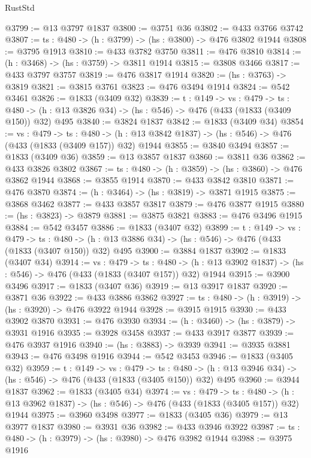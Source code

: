 \begin{lexlean}{RustStd}
\begin{coremodule}
@3799 := @13 @3797 @1837
@3800 := @3751 @36
@3802 := @433 @3766 @3742
@3807 := {ts : @480} -> (h : @3799) -> (hs : @3800) -> @476 @3802 @1944
@3808 := @3795 @1913
@3810 := @433 @3782 @3750
@3811 := @476 @3810
@3814 := (h : @3468) -> (hs : @3759) -> @3811 @1914
@3815 := @3808 @3466
@3817 := @433 @3797 @3757
@3819 := @476 @3817 @1914
@3820 := (hs : @3763) -> @3819
@3821 := @3815 @3761
@3823 := @476 @3494 @1914
@3824 := @542 @3461
@3826 := @1833 (@3409 @32)
@3839 := {t : @149} ->
  {vs : @479} ->
  {ts : @480} -> (h : @13 @3826 @34) -> (hs : @546) -> @476 (@433 (@1833 (@3409 @150)) @32) @495
@3840 := @3824 @1837
@3842 := @1833 (@3409 @34)
@3854 := {vs : @479} ->
  {ts : @480} -> (h : @13 @3842 @1837) -> (hs : @546) -> @476 (@433 (@1833 (@3409 @157)) @32) @1944
@3855 := @3840 @3494
@3857 := @1833 (@3409 @36)
@3859 := @13 @3857 @1837
@3860 := @3811 @36
@3862 := @433 @3826 @3802
@3867 := {ts : @480} -> (h : @3859) -> (hs : @3860) -> @476 @3862 @1944
@3868 := @3855 @1914
@3870 := @433 @3842 @3810
@3871 := @476 @3870
@3874 := (h : @3464) -> (hs : @3819) -> @3871 @1915
@3875 := @3868 @3462
@3877 := @433 @3857 @3817
@3879 := @476 @3877 @1915
@3880 := (hs : @3823) -> @3879
@3881 := @3875 @3821
@3883 := @476 @3496 @1915
@3884 := @542 @3457
@3886 := @1833 (@3407 @32)
@3899 := {t : @149} ->
  {vs : @479} ->
  {ts : @480} -> (h : @13 @3886 @34) -> (hs : @546) -> @476 (@433 (@1833 (@3407 @150)) @32) @495
@3900 := @3884 @1837
@3902 := @1833 (@3407 @34)
@3914 := {vs : @479} ->
  {ts : @480} -> (h : @13 @3902 @1837) -> (hs : @546) -> @476 (@433 (@1833 (@3407 @157)) @32) @1944
@3915 := @3900 @3496
@3917 := @1833 (@3407 @36)
@3919 := @13 @3917 @1837
@3920 := @3871 @36
@3922 := @433 @3886 @3862
@3927 := {ts : @480} -> (h : @3919) -> (hs : @3920) -> @476 @3922 @1944
@3928 := @3915 @1915
@3930 := @433 @3902 @3870
@3931 := @476 @3930
@3934 := (h : @3460) -> (hs : @3879) -> @3931 @1916
@3935 := @3928 @3458
@3937 := @433 @3917 @3877
@3939 := @476 @3937 @1916
@3940 := (hs : @3883) -> @3939
@3941 := @3935 @3881
@3943 := @476 @3498 @1916
@3944 := @542 @3453
@3946 := @1833 (@3405 @32)
@3959 := {t : @149} ->
  {vs : @479} ->
  {ts : @480} -> (h : @13 @3946 @34) -> (hs : @546) -> @476 (@433 (@1833 (@3405 @150)) @32) @495
@3960 := @3944 @1837
@3962 := @1833 (@3405 @34)
@3974 := {vs : @479} ->
  {ts : @480} -> (h : @13 @3962 @1837) -> (hs : @546) -> @476 (@433 (@1833 (@3405 @157)) @32) @1944
@3975 := @3960 @3498
@3977 := @1833 (@3405 @36)
@3979 := @13 @3977 @1837
@3980 := @3931 @36
@3982 := @433 @3946 @3922
@3987 := {ts : @480} -> (h : @3979) -> (hs : @3980) -> @476 @3982 @1944
@3988 := @3975 @1916

\end{coremodule}
\end{lexlean}
